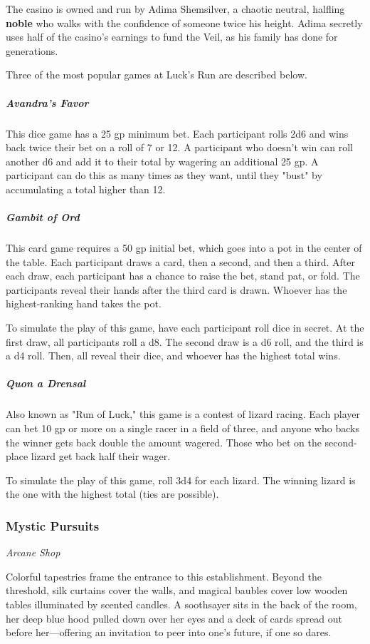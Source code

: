 \documentclass[10pt,a4paper,twoside,fancy,bg=print,twocolumn,openany,nodeprecatedcode]{dndbook}
\begin{document}
The casino is owned and run by Adima Shemsilver, a chaotic neutral, halfling \textbf{noble} who walks with the confidence of someone twice his height. Adima secretly uses half of the casino's earnings to fund the Veil, as his family has done for generations.

Three of the most popular games at Luck's Run are described below.

\subparagraph{Avandra's Favor}
This dice game has a 25 gp minimum bet. Each participant rolls 2d6 and wins back twice their bet on a roll of 7 or 12. A participant who doesn't win can roll another d6 and add it to their total by wagering an additional 25 gp. A participant can do this as many times as they want, until they "bust" by accumulating a total higher than 12.

\subparagraph{Gambit of Ord}
This card game requires a 50 gp initial bet, which goes into a pot in the center of the table. Each participant draws a card, then a second, and then a third. After each draw, each participant has a chance to raise the bet, stand pat, or fold. The participants reveal their hands after the third card is drawn. Whoever has the highest-ranking hand takes the pot.

To simulate the play of this game, have each participant roll dice in secret. At the first draw, all participants roll a d8. The second draw is a d6 roll, and the third is a d4 roll. Then, all reveal their dice, and whoever has the highest total wins.

\subparagraph{Quon a Drensal}
Also known as "Run of Luck," this game is a contest of lizard racing. Each player can bet 10 gp or more on a single racer in a field of three, and anyone who backs the winner gets back double the amount wagered. Those who bet on the second-place lizard get back half their wager.

To simulate the play of this game, roll 3d4 for each lizard. The winning lizard is the one with the highest total (ties are possible).

\subsubsection{Mystic Pursuits}
\textit{Arcane Shop}

Colorful tapestries frame the entrance to this establishment. Beyond the threshold, silk curtains cover the walls, and magical baubles cover low wooden tables illuminated by scented candles. A soothsayer sits in the back of the room, her deep blue hood pulled down over her eyes and a deck of cards spread out before her—offering an invitation to peer into one's future, if one so dares.
\end{document}
